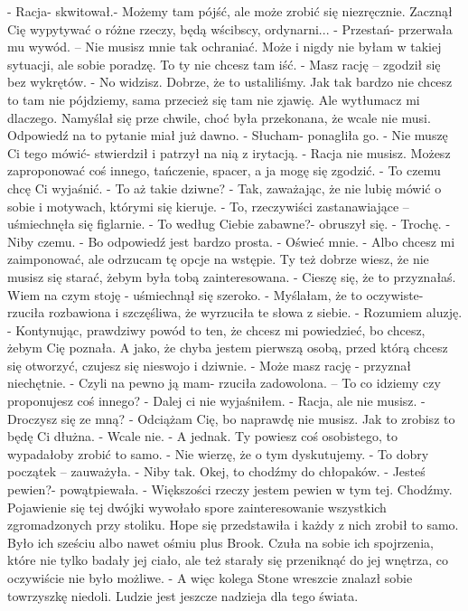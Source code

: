 \documentclass[12pt,a4paper]{book}
\begin{document}
- Racja- skwitował.- Możemy tam pójść, ale może zrobić się niezręcznie. Zacznął Cię wypytywać o różne rzeczy, będą wścibscy, ordynarni...
- Przestań- przerwała mu wywód. – Nie musisz mnie tak ochraniać. Może i nigdy nie byłam w takiej sytuacji, ale sobie poradzę. To ty nie chcesz tam iść. 
- Masz rację – zgodził się bez wykrętów. 
- No widzisz. Dobrze, że to ustaliliśmy. Jak tak bardzo nie chcesz to tam nie pójdziemy, sama przecież się tam nie zjawię. Ale wytłumacz mi dlaczego.
Namyślał się prze chwile, choć była przekonana, że wcale nie musi. Odpowiedź na to pytanie miał już dawno.
- Słucham- ponagliła go. 
- Nie muszę Ci tego mówić- stwierdził i patrzył na nią z irytacją. 
- Racja nie musisz. Możesz zaproponować coś innego, tańczenie, spacer, a ja mogę się zgodzić. 
- To czemu chcę Ci wyjaśnić. 
- To aż takie dziwne?
- Tak, zaważając, że nie lubię mówić o sobie i motywach, którymi się kieruje. 
- To, rzeczywiści zastanawiające – uśmiechnęła się figlarnie.
- To według Ciebie zabawne?- obruszył się. 
- Trochę.
- Niby czemu.
- Bo odpowiedź jest bardzo prosta.
- Oświeć mnie.
- Albo chcesz mi zaimponować, ale odrzucam tę opcje na wstępie. Ty też dobrze wiesz, że nie musisz się starać, żebym była tobą zainteresowana. 
- Cieszę się, że to przyznałaś. Wiem na czym stoję - uśmiechnął się szeroko.
- Myślałam, że to oczywiste- rzuciła rozbawiona i szczęśliwa, że wyrzuciła te słowa z siebie. 
- Rozumiem aluzję. 
- Kontynując, prawdziwy powód to ten, że chcesz mi powiedzieć, bo chcesz, żebym Cię poznała. A jako, że chyba jestem pierwszą osobą, przed którą chcesz się otworzyć, czujesz się nieswojo i dziwnie. 
- Może masz rację - przyznał niechętnie. 
- Czyli na pewno ją mam- rzuciła zadowolona. – To co idziemy czy proponujesz coś innego?
- Dalej ci nie wyjaśniłem. 
- Racja, ale nie musisz.
- Droczysz się ze mną?
- Odciążam Cię, bo naprawdę nie musisz. Jak to zrobisz to będę Ci dłużna. 
- Wcale nie.
- A jednak. Ty powiesz coś osobistego, to wypadałoby zrobić to samo. 
- Nie wierzę, że o tym dyskutujemy. 
- To dobry początek – zauważyła. 
- Niby tak. Okej, to chodźmy do chłopaków. 
- Jesteś pewien?- powątpiewała. 
- Większości rzeczy jestem pewien w tym tej. Chodźmy. 
Pojawienie się tej dwójki wywołało spore zainteresowanie wszystkich zgromadzonych przy stoliku. Hope się przedstawiła i każdy z nich zrobił to samo. Było ich sześciu albo nawet ośmiu plus Brook. Czuła na sobie ich spojrzenia, które nie tylko badały jej ciało, ale też starały się przeniknąć do jej wnętrza, co oczywiście nie było możliwe. 
- A więc kolega Stone wreszcie znalazł sobie towrzyszkę niedoli. Ludzie jest jeszcze nadzieja dla tego świata. 
\end{document}
